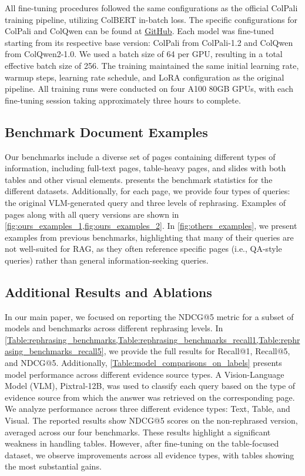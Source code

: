 All fine-tuning procedures followed the same configurations as the official ColPali training pipeline, utilizing ColBERT in-batch loss. The specific configurations for ColPali and ColQwen can be found at \href{https://github.com/illuin-tech/colpali}{GitHub}.  Each model was fine-tuned starting from its respective base version: ColPali from ColPali-1.2 and ColQwen from ColQwen2-1.0. We used a batch size of 64 per GPU, resulting in a total effective batch size of 256. The training maintained the same initial learning rate, warmup steps, learning rate schedule, and LoRA configuration as the original pipeline.  All training runs were conducted on four A100 80GB GPUs, with each fine-tuning session taking approximately three hours to complete.


\subsection{Benchmark Document Examples}  
Our benchmarks include a diverse set of pages containing different types of information, including full-text pages, table-heavy pages, and slides with both tables and other visual elements.  presents the benchmark statistics for the different datasets.   Additionally, for each page, we provide four types of queries: the original VLM-generated query and three levels of rephrasing. Examples of pages along with all query versions are shown in \cref{fig:ours_examples_1,fig:ours_examples_2}. In \cref{fig:others_examples}, we present examples from previous benchmarks, highlighting that many of their queries are not well-suited for RAG, as they often reference specific pages (i.e., QA-style queries) rather than general information-seeking queries.

\subsection{Additional Results and Ablations} \label{sec:additional_results}
In our main paper, we focused on reporting the NDCG@5 metric for a subset of models and benchmarks across different rephrasing levels. In \cref{Table:rephrasing_benchmarks,Table:rephrasing_benchmarks_recall1,Table:rephrasing_benchmarks_recall5}, we provide the full results for Recall@1, Recall@5, and NDCG@5.  Additionally, \cref{Table:model_comparisons_on_labels} presents model performance across different evidence source types. A Vision-Language Model (VLM), Pixtral-12B, was used to classify each query based on the type of evidence source from which the answer was retrieved on the corresponding page. We analyze performance across three different evidence types: Text, Table, and Visual. The reported results show NDCG@5 scores on the non-rephrased version, averaged across our four benchmarks. These results highlight a significant weakness in handling tables. However, after fine-tuning on the table-focused dataset, we observe improvements across all evidence types, with tables showing the most substantial gains.

